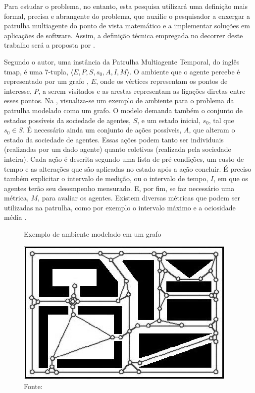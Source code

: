 Para estudar o problema, no entanto, esta pesquisa utilizará uma definição mais 
formal, precisa e abrangente do problema, que auxilie o pesquisador a enxergar 
a patrulha multiagente do ponto de vista matemático e a implementar soluções em 
aplicações de software. Assim, a definição técnica empregada no decorrer deste 
trabalho será a proposta por \citep{sampaiophd}.

Segundo o autor, uma instância da Patrulha Multiagente Temporal, do inglês 
\ac{tmap}, é uma 7-tupla, $ \langle E, P, S, s_{0}, A, I, M \rangle $. O 
ambiente que o agente percebe é representado por um grafo 
\citep{Rosen:2002:DMA:579402}, $E$, onde os vértices representam os pontos de 
interesse, $P$, a serem visitados e as arestas representam as ligações diretas 
entre esses pontos. Na , visualiza-se um exemplo de 
ambiente para o problema da patrulha modelado como um grafo. O modelo demanda 
também o conjunto de estados possíveis da sociedade de agentes, $S$, e um estado 
inicial, $ s_{0} $, tal que $ s_{0} \in S $. É necessário ainda um conjunto de 
ações possíveis, $A$, que alteram o estado da sociedade de agentes. Essas ações 
podem tanto ser individuais (realizadas por um dado agente) quanto coletivas 
(realizada pela sociedade inteira). Cada ação é descrita segundo uma lista de 
pré-condições, um custo de tempo e as alterações que são aplicadas no estado 
após a ação concluir. É preciso também explicitar o intervalo de medição, ou o 
intervalo de tempo, $I$, em que os agentes terão seu desempenho mensurado. E, 
por fim, se faz necessário uma métrica, $M$, para avaliar os 
agentes. Existem diversas métricas que podem ser utilizadas na patrulha, como 
por exemplo o intervalo máximo \citep{Chevaleyre:2004:TAM:1018411.1019013} e 
a ociosidade média \citep{hernandez2013game}.

\begin{figure}[tp]
	\caption[Exemplo de ambiente modelado em um grafo]{Exemplo de ambiente 
		modelado em um grafo}
	\centering
	\includegraphics[width=0.75\columnwidth]{images/grafoExemplo.png}
	\caption*{Fonte: \citep{machado2002b}}
	\label{fig:graphexample}
\end{figure}

